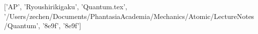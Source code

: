 ['AP', 'Ryoushirikigaku', 'Quantum.tex', '/Users/zechen/Documents/PhantasiaAcademia/Mechanics/Atomic/LectureNotes/Quantum', '\x8e\x9f\xad{}', '\x8e\x9f\xad{}']
